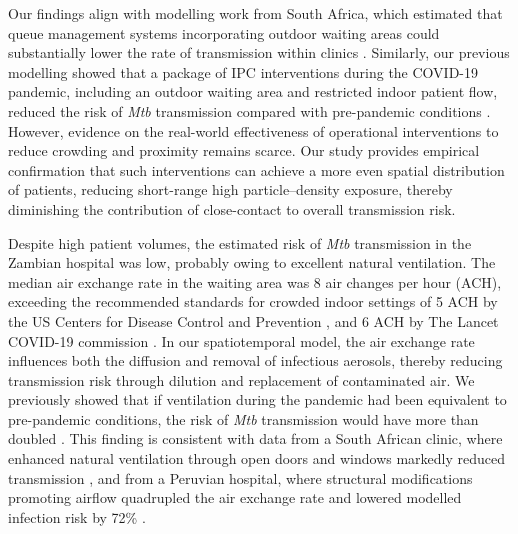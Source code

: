 \documentclass[11pt]{article}
\begin{document}
Our findings align with modelling work from South Africa, which estimated that queue management systems incorporating outdoor waiting areas could substantially lower the rate of transmission within clinics \cite{mccreesh2021BMJGlobHealth}. Similarly, our previous modelling showed that a package of IPC interventions during the COVID-19 pandemic, including an outdoor waiting area and restricted indoor patient flow, reduced the risk of \emph{Mtb} transmission compared with pre-pandemic conditions \cite{banholzer2025IntJInfectDis}. However, evidence on the real-world effectiveness of operational interventions to reduce crowding and proximity remains scarce. Our study provides empirical confirmation that such interventions can achieve a more even spatial distribution of patients, reducing short-range high particle--density exposure, thereby diminishing the contribution of close-contact to overall transmission risk.

Despite high patient volumes, the estimated risk of \emph{Mtb} transmission in the Zambian hospital was low, probably owing to excellent natural ventilation. The median air exchange rate in the waiting area was 8 air changes per hour (ACH), exceeding the recommended standards for crowded indoor settings of 5 ACH by the US Centers for Disease Control and Prevention \cite{uscentersfordiseasecontrolandprevention2025RespiratoryIllnesses}, and 6 ACH by The Lancet COVID-19 commission \cite{thelancetcovid-19commissiontaskforceonsafeworksafeschoolandsafetravel2022}. In our spatiotemporal model, the air exchange rate influences both the diffusion and removal of infectious aerosols, thereby reducing transmission risk through dilution and replacement of contaminated air. We previously showed that if ventilation during the pandemic had been equivalent to pre-pandemic conditions, the risk of \emph{Mtb} transmission would have more than doubled \cite{banholzer2025PLOSComputBiol}. This finding is consistent with data from a South African clinic, where enhanced natural ventilation through open doors and windows markedly reduced transmission \cite{beckwith2022PLOSGlobalPublicHealth}, and from a Peruvian hospital, where structural modifications promoting airflow quadrupled the air exchange rate and lowered modelled infection risk by 72\% \cite{escombe2019BMCInfectDis}.
\end{document}
